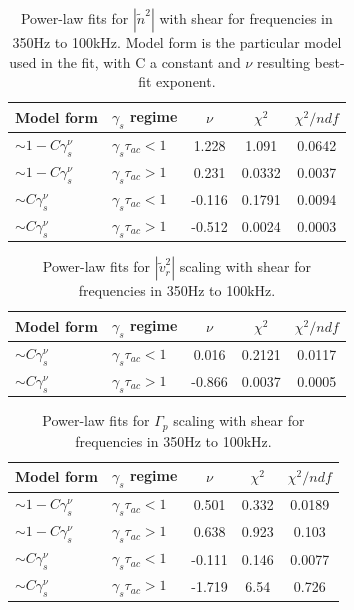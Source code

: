 \documentclass[aip,pop,amsmath,amssymb,peprint,superscriptaddress]{revtex4-1} %
\begin{document}
\begin{table}
\caption{\label{tab:table1}Power-law fits for $|\tilde{n}^{2}|$  with shear for frequencies in 350Hz to 100kHz. Model form is the particular model used in the fit, with C a constant and $\nu$ resulting best-fit exponent.}
\begin{ruledtabular}
\begin{tabular}{llccc}
Model form&$\gamma_{s}$ regime&$\nu$&$\chi^2$&$\chi^2/ndf$\\
\hline
$\sim 1-C\gamma_{s}^\nu$&$\gamma_{s}\tau_{ac}<1$&1.228&1.091&0.0642\\
$\sim 1-C\gamma_{s}^\nu$&$\gamma_{s}\tau_{ac}>1$&0.231&0.0332&0.0037\\
$\sim C\gamma_{s}^\nu$&$\gamma_{s}\tau_{ac}<1$&-0.116&0.1791&0.0094\\
$\sim C\gamma_{s}^\nu$&$\gamma_{s}\tau_{ac}>1$&-0.512&0.0024&0.0003\\
\end{tabular}
\end{ruledtabular}
\end{table}

\begin{table}
\caption{\label{tab:table2}Power-law fits for $|\tilde{v}_{r}^{2}|$ scaling with shear for frequencies in 350Hz to 100kHz.}
\begin{ruledtabular}
\begin{tabular}{llccc}
Model form&$\gamma_{s}$ regime&$\nu$&$\chi^2$&$\chi^2/ndf$\\
\hline
$\sim C\gamma_{s}^\nu$&$\gamma_{s}\tau_{ac}<1$&0.016&0.2121&0.0117\\
$\sim C\gamma_{s}^\nu$&$\gamma_{s}\tau_{ac}>1$&-0.866&0.0037&0.0005\\
\end{tabular}
\end{ruledtabular}
\end{table}

\begin{table}
\caption{\label{tab:table3}Power-law fits for $\Gamma_{p}$ scaling with shear for frequencies in 350Hz to 100kHz.}
\begin{ruledtabular}
\begin{tabular}{llccc}
Model form&$\gamma_{s}$ regime&$\nu$&$\chi^2$&$\chi^2/ndf$\\
\hline
$\sim 1-C\gamma_{s}^\nu$&$\gamma_{s}\tau_{ac}<1$ &0.501   &0.332    &0.0189\\
$\sim 1-C\gamma_{s}^\nu$&$\gamma_{s}\tau_{ac}>1$ &0.638   &0.923    &0.103\\
$\sim C\gamma_{s}^\nu$&$\gamma_{s}\tau_{ac}<1$   &-0.111  &0.146    &0.0077\\
$\sim C\gamma_{s}^\nu$&$\gamma_{s}\tau_{ac}>1$   &-1.719  &6.54    &0.726\\
\end{tabular}
\end{ruledtabular}
\end{table}
\end{document}

